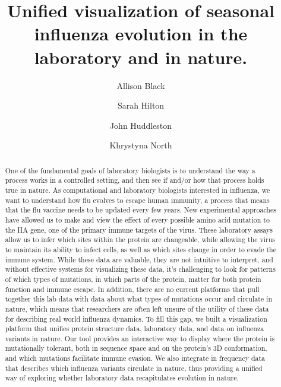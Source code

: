 \documentclass[sigchi]{acmart}
\begin{document}
\title{Unified visualization of seasonal influenza evolution in the laboratory and in nature.
}

\author{Allison Black}
\author{Sarah Hilton}
\author{John Huddleston}
\author{Khrystyna North}

\renewcommand{\shortauthors}{Black, Hilton, Huddleston, and North}

\begin{abstract}
One of the fundamental goals of laboratory biologists is to understand the way a process works in a controlled setting, and then see if and/or how that process holds true in nature. As computational and laboratory biologists interested in influenza, we want to understand how flu evolves to escape human immunity, a process that means that the flu vaccine needs to be updated every few years. New experimental approaches have allowed us to make and view the effect of every possible amino acid mutation to the HA gene, one of the primary immune targets of the virus. These laboratory assays allow us to infer which sites within the protein are changeable, while allowing the virus to maintain its ability to infect cells, as well as which sites change in order to evade the immune system. While these data are valuable, they are not intuitive to interpret, and without effective systems for visualizing these data, it's challenging to look for patterns of which types of mutations, in which parts of the protein, matter for both protein function and immune escape. In addition, there are no current platforms that pull together this lab data with data about what types of mutations occur and circulate in nature, which means that researchers are often left unsure of the utility of these data for describing real world influenza dynamics. To fill this gap, we built a visualization platform that unifies protein structure data, laboratory data, and data on influenza variants in nature. Our tool provides an interactive way to display where the protein is mutationally tolerant, both in sequence space and on the protein's 3D conformation, and which mutations facilitate immune evasion. We also integrate in frequency data that describes which influenza variants circulate in nature, thus providing a unified way of exploring whether laboratory data recapitulates evolution in nature.
\end{abstract}
\end{document}
